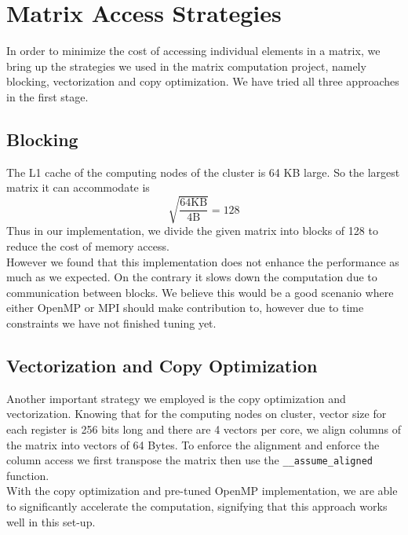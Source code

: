 \documentclass[12pt]{article}
\begin{document}
\section{Matrix Access Strategies}
In order to minimize the cost of accessing individual elements in a matrix, we bring up the strategies we used in the matrix computation project, namely blocking, vectorization and copy optimization. We have tried all three approaches in the first stage.
\subsection{Blocking}
The L1 cache of the computing nodes of the cluster is 64 KB large. So the largest matrix it can accommodate is
$$ \sqrt{\frac{64 \text{KB}}{4 \text{B}}} = 128 $$
Thus in our implementation, we divide the given matrix into blocks of 128 to reduce the cost of memory access.\\
However we found that this implementation does not enhance the performance as much as we expected. On the contrary it slows down the computation due to communication between blocks. We believe this would be a good scenanio where either OpenMP or MPI should make contribution to, however due to time constraints we have not finished tuning yet.
\subsection{Vectorization and Copy Optimization}
Another important strategy we employed is the copy optimization and vectorization. Knowing that for the computing nodes on cluster, vector size for each register is 256 bits long and there are 4 vectors per core, we align columns of the matrix into vectors of 64 Bytes. To enforce the alignment and enforce the column access we first transpose the matrix then use the \texttt{\_\_assume\_aligned} function.\\
With the copy optimization and pre-tuned OpenMP implementation, we are able to significantly accelerate the computation, signifying that this approach works well in this set-up.
\end{document}
